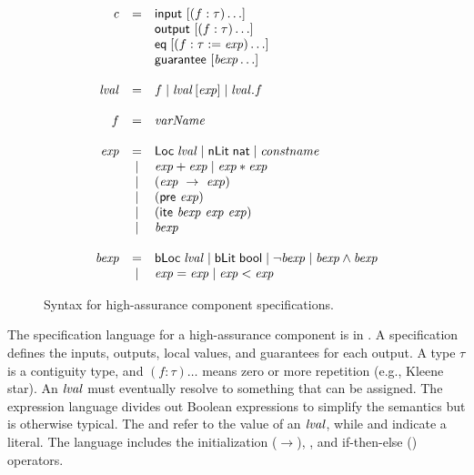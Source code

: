 \begin{figure}
  \[
    \begin{array}{rcl}
      \mathit{c}    & = & \konst{input}\ [(f : \tau)\ldots] \\
                    &   & \konst{output}\ [(f : \tau)\ldots] \\
                    &   & \konst{eq}\; [(f : \tau := \mathit{exp})\ldots] \\
                    &   & \konst{guarantee}\ [\mathit{bexp}\ldots]\\\\
      
      \lval         & = & f \mid \lval \, [ \mathit{exp} ]
                          \mid \lval . f \\ \\

      f             & = & \mathit{varName} \\ \\

      \mathit{exp}  & = & \konst{Loc}\; \lval
                          \mid \konst{nLit}\; \konst{nat}
                          \mid \mathit{constname} \\
                    & | & \mathit{exp} + \mathit{exp}
                          \mid \mathit{exp} * \mathit{exp} \\
                    & | & (\mathit{exp}\ \rightarrow\ \mathit{exp}) \\
                    & | & (\konst{pre}\ \mathit{exp}) \\
                    & | & (\konst{ite}\ \mathit{bexp}\ \mathit{exp}\ \mathit{exp})\\
                    & | & \mathit{bexp} \\ \\
                          
      \mathit{bexp} & = & \konst{bLoc}\; \lval
                          \mid  \konst{bLit}\; \konst{bool}
                          \mid  \neg \mathit{bexp}
                          \mid  \mathit{bexp} \land \mathit{bexp} \\
                    & | & \mathit{exp} = \mathit{exp} 
                    \mid  \mathit{exp} < \mathit{exp}
\end{array}
\]
\caption{Syntax for high-assurance component specifications.}
\label{fig:syntax}
\end{figure}

The specification language for a high-assurance component is in . A specification defines the inputs, outputs, local values, and guarantees for each output. A type $\tau$ is a contiguity type, and $(f : \tau)\ldots$ means zero or more repetition (e.g., Kleene star). An $\mathit{lval}$ must eventually resolve to something that can be assigned. The expression language divides out Boolean expressions to simplify the semantics but is otherwise typical. The  and  refer to the value of an $\mathit{lval}$, while  and  indicate a literal. The language includes the initialization ($\rightarrow$), , and if-then-else () operators.

